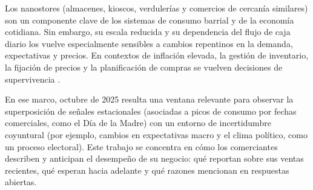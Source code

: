 Los nanostores (almacenes, kioscos, verdulerías y comercios de cercanía similares) son un componente clave de los sistemas de consumo barrial y de la economía cotidiana. Sin embargo, su escala reducida y su dependencia del flujo de caja diario los vuelve especialmente sensibles a cambios repentinos en la demanda, expectativas y precios. En contextos de inflación elevada, la gestión de inventario, la fijación de precios y la planificación de compras se vuelven decisiones de supervivencia \parencite{indec_ipc}.

En ese marco, octubre de 2025 resulta una ventana relevante para observar la superposición de señales estacionales (asociadas a picos de consumo por fechas comerciales, como el Día de la Madre) con un entorno de incertidumbre coyuntural (por ejemplo, cambios en expectativas macro y el clima político, como un proceso electoral). Este trabajo se concentra en cómo los comerciantes describen y anticipan el desempeño de su negocio: qué reportan sobre sus ventas recientes, qué esperan hacia adelante y qué razones mencionan en respuestas abiertas.

\newpage
